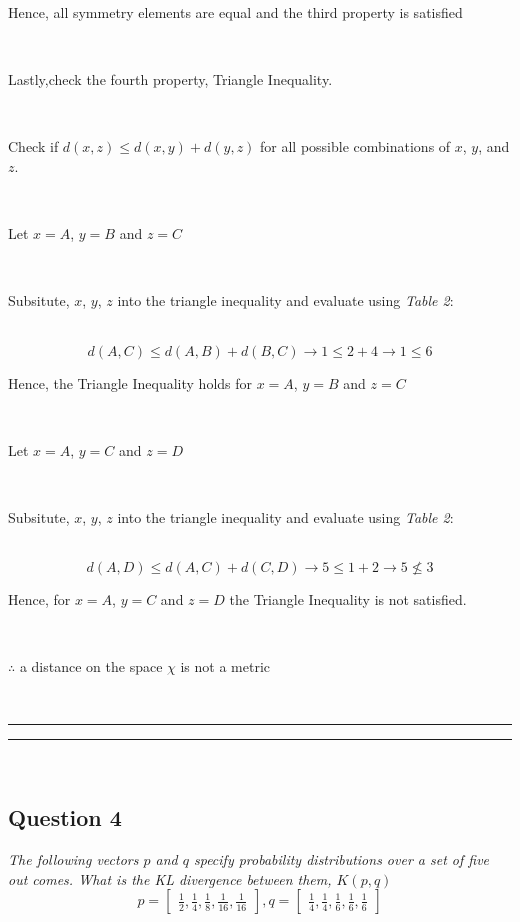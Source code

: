 \documentclass{article}
\begin{document}
\parbox{\textwidth}{Hence, all symmetry elements are equal and the third property is satisfied}\\

\parbox{\textwidth}{Lastly,check the fourth property, Triangle Inequality.}\\

\parbox{\textwidth}{Check if $d(x,z) \leq d(x,y) + d(y,z)$ for all possible combinations of $x$, $y$, and $z$.}\\

\parbox{\textwidth}{Let $x=A$, $y=B$ and $z=C$}\\

\parbox{\textwidth}{Subsitute, $x$, $y$, $z$ into the triangle inequality and evaluate using \textit{Table 2}:}\\

$$d(A,C) \leq d(A,B) + d(B,C) \rightarrow 1 \leq 2 + 4 \rightarrow 1 \leq 6$$

\parbox{\textwidth}{Hence, the Triangle Inequality holds for $x=A$, $y=B$ and $z=C$}\\

\parbox{\textwidth}{Let $x=A$, $y=C$ and $z=D$}\\

\parbox{\textwidth}{Subsitute, $x$, $y$, $z$ into the triangle inequality and evaluate using \textit{Table 2}:}\\

$$d(A,D) \leq d(A,C) + d(C,D) \rightarrow 5 \leq 1 + 2 \rightarrow 5 \nleq 3$$

\parbox{\textwidth}{Hence, for $x=A$, $y=C$ and $z=D$ the Triangle Inequality is not satisfied.}\\

\parbox{\textwidth}{$\therefore$ a distance on the space $\chi$ is not a metric}\\

\noindent\rule{\textwidth}{0.4pt}
\noindent\rule{\textwidth}{0.4pt}\\

\newpage

\subsection*{Question 4}
\textit{The following vectors $p$ and $q$ specify probability distributions over a set of five out comes. What is the KL divergence between them, $K(p,q)$}\\

$$p =\begin{bmatrix}
    \frac{1}{2} , \frac{1}{4} , \frac{1}{8} , \frac{1}{16} , \frac{1}{16}
\end{bmatrix} , q = \begin{bmatrix}
    \frac{1}{4} , \frac{1}{4} , \frac{1}{6} , \frac{1}{6} , \frac{1}{6}
\end{bmatrix}$$
\end{document}
